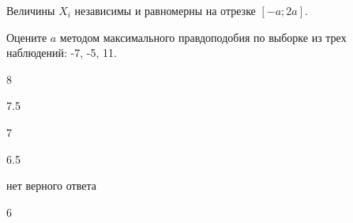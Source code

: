 
\begin{question}
Величины \(X_i\) независимы и равномерны на отрезке \([-a;2a]\).

Оцените \(a\) методом максимального правдоподобия по выборке из трех
наблюдений: -7, -5, 11.
\begin{answerlist}
  \item 8
  \item 7.5
  \item 7
  \item 6.5
  \item нет верного ответа
  \item 6
\end{answerlist}
\end{question}


